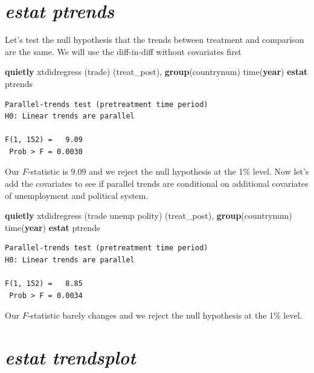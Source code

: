 \documentclass[
]{book}
\newenvironment{Shaded}{\begin{snugshade}}{\end{snugshade}}
\newcommand{\FunctionTok}[1]{\textcolor[rgb]{0.13,0.29,0.53}{\textbf{#1}}}
\newcommand{\KeywordTok}[1]{\textcolor[rgb]{0.13,0.29,0.53}{\textbf{#1}}}
\newcommand{\NormalTok}[1]{#1}
\begin{document}
\section{\texorpdfstring{\emph{estat ptrends}}{estat ptrends}}\label{estat-ptrends}

Let's test the null hypothesis that the trends between treatment and comparison are the same. We will use the diff-in-diff without covariates first

\begin{Shaded}
\begin{Highlighting}[]
\KeywordTok{quietly}\NormalTok{ xtdidregress (trade) (treat\_post), }\FunctionTok{group}\NormalTok{(countrynum) time(}\FunctionTok{year}\NormalTok{)}
\KeywordTok{estat}\NormalTok{ ptrends}
\end{Highlighting}
\end{Shaded}

\begin{verbatim}
Parallel-trends test (pretreatment time period)
H0: Linear trends are parallel

F(1, 152) =   9.09
 Prob > F = 0.0030
\end{verbatim}

Our \(F\)-statistic is \(9.09\) and we reject the null hypothesis at the 1\% level. Now let's add the covariates to see if parallel trends are conditional on additional covariates of unemployment and political system.

\begin{Shaded}
\begin{Highlighting}[]
\KeywordTok{quietly}\NormalTok{ xtdidregress (trade unemp polity) (treat\_post), }\FunctionTok{group}\NormalTok{(countrynum) time(}\FunctionTok{year}\NormalTok{)}
\KeywordTok{estat}\NormalTok{ ptrends}
\end{Highlighting}
\end{Shaded}

\begin{verbatim}
Parallel-trends test (pretreatment time period)
H0: Linear trends are parallel

F(1, 152) =   8.85
 Prob > F = 0.0034
\end{verbatim}

Our \(F\)-statistic barely changes and we reject the null hypothesis at the 1\% level.

\section{\texorpdfstring{\emph{estat trendsplot}}{estat trendsplot}}\label{estat-trendsplot}
\end{document}
